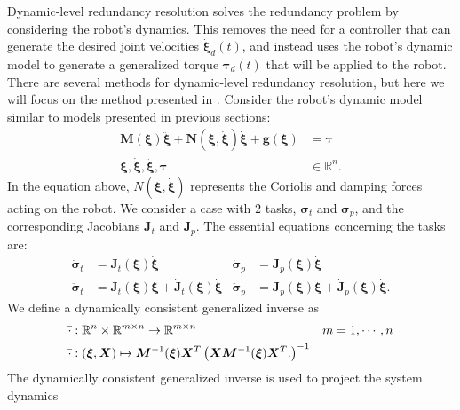 Dynamic-level redundancy resolution solves the redundancy problem by considering
the robot's dynamics. This removes the need for a controller that can generate
the desired joint velocities $\dot{\bm{\xi}}_d(t)$, and instead uses the robot's
dynamic model to generate a generalized torque $\bm{\tau}_d(t)$ that will
be applied to the robot. There are several methods for dynamic-level redundancy
resolution, but here we will focus on the method presented in \cite{khatib2004}.
Consider the robot's dynamic model similar to models presented in previous sections:
\begin{subequations}
\begin{align}
    \bm{M}(\bm{\xi}) \ddot{\bm{\xi}} + \bm{N}(\bm{\xi}, \dot{\bm{\xi}}) \dot{\bm{\xi}} + \bm{g}(\bm{\xi}) &= \bm{\tau} \\
    \bm{\xi}, \dot{\bm{\xi}} ,\ddot{\bm{\xi}},\bm{\tau} &\in \mathbb{R}^n.
\end{align}
\end{subequations}
In the equation above, $N(\bm{\xi}, \dot{\bm{\xi}})$ represents the Coriolis and
damping forces acting on the robot. We consider a case with $2$ tasks, $\bm{\sigma}_t$
and $\bm{\sigma}_p$, and the corresponding Jacobians $\bm{J}_t$ and $\bm{J}_p$.
The essential equations concerning the tasks are:
\begin{subequations}
    \begin{align}
        \dot{\bm{\sigma}}_t &= \bm{J}_t(\bm{\xi}) \dot{\bm{\xi}} & \dot{\bm{\sigma}}_p &= \bm{J}_p(\bm{\xi}) \dot{\bm{\xi}} \\
        \ddot{\bm{\sigma}}_t &= \bm{J}_t(\bm{\xi}) \ddot{\bm{\xi}} + \dot{\bm{J}}_t(\bm{\xi}) \dot{\bm{\xi}} &
        \ddot{\bm{\sigma}}_p &= \bm{J}_p(\bm{\xi}) \ddot{\bm{\xi}} + \dot{\bm{J}}_p(\bm{\xi}) \dot{\bm{\xi}}.
    \end{align}
\end{subequations}
We define a dynamically consistent generalized inverse \cite{khatib1987} as
\begin{subequations}
    \begin{align}
        \bar{\cdot} &: \mathbb{R}^n \times \mathbb{R}^{m\times n} \rightarrow \mathbb{R}^{m\times n} & m &= 1, \cdots, n\\
        \bar{\cdot} &: (\bm{\xi},\bm{X}) \mapsto \bm{M}^{-1}(\bm{\xi})\bm{X}^T\left(
            \bm{X}\bm{M}^{-1}(\bm{\xi})\bm{X}^T.
        \right)^{-1}
    \end{align}
\end{subequations}
The dynamically consistent generalized inverse is used to project the system dynamics
